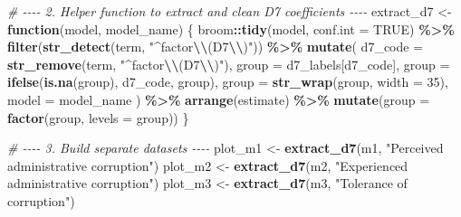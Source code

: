 \documentclass[
]{article}
\newenvironment{Shaded}{\begin{snugshade}}{\end{snugshade}}
\newcommand{\AttributeTok}[1]{\textcolor[rgb]{0.13,0.29,0.53}{#1}}
\newcommand{\CommentTok}[1]{\textcolor[rgb]{0.56,0.35,0.01}{\textit{#1}}}
\newcommand{\ConstantTok}[1]{\textcolor[rgb]{0.56,0.35,0.01}{#1}}
\newcommand{\ControlFlowTok}[1]{\textcolor[rgb]{0.13,0.29,0.53}{\textbf{#1}}}
\newcommand{\DecValTok}[1]{\textcolor[rgb]{0.00,0.00,0.81}{#1}}
\newcommand{\FunctionTok}[1]{\textcolor[rgb]{0.13,0.29,0.53}{\textbf{#1}}}
\newcommand{\NormalTok}[1]{#1}
\newcommand{\OtherTok}[1]{\textcolor[rgb]{0.56,0.35,0.01}{#1}}
\newcommand{\SpecialCharTok}[1]{\textcolor[rgb]{0.81,0.36,0.00}{\textbf{#1}}}
\newcommand{\StringTok}[1]{\textcolor[rgb]{0.31,0.60,0.02}{#1}}
\begin{document}
\begin{Shaded}
\begin{Highlighting}[]
\CommentTok{\# {-}{-}{-}{-} 2. Helper function to extract and clean D7 coefficients {-}{-}{-}{-}}
\NormalTok{extract\_d7 }\OtherTok{\textless{}{-}} \ControlFlowTok{function}\NormalTok{(model, model\_name) \{}
\NormalTok{  broom}\SpecialCharTok{::}\FunctionTok{tidy}\NormalTok{(model, }\AttributeTok{conf.int =} \ConstantTok{TRUE}\NormalTok{) }\SpecialCharTok{\%\textgreater{}\%}
    \FunctionTok{filter}\NormalTok{(}\FunctionTok{str\_detect}\NormalTok{(term, }\StringTok{"\^{}factor}\SpecialCharTok{\textbackslash{}\textbackslash{}}\StringTok{(D7}\SpecialCharTok{\textbackslash{}\textbackslash{}}\StringTok{)"}\NormalTok{)) }\SpecialCharTok{\%\textgreater{}\%}
    \FunctionTok{mutate}\NormalTok{(}
      \AttributeTok{d7\_code =} \FunctionTok{str\_remove}\NormalTok{(term, }\StringTok{"\^{}factor}\SpecialCharTok{\textbackslash{}\textbackslash{}}\StringTok{(D7}\SpecialCharTok{\textbackslash{}\textbackslash{}}\StringTok{)"}\NormalTok{),}
      \AttributeTok{group =}\NormalTok{ d7\_labels[d7\_code],}
      \AttributeTok{group =} \FunctionTok{ifelse}\NormalTok{(}\FunctionTok{is.na}\NormalTok{(group), d7\_code, group),}
      \AttributeTok{group =} \FunctionTok{str\_wrap}\NormalTok{(group, }\AttributeTok{width =} \DecValTok{35}\NormalTok{),}
      \AttributeTok{model =}\NormalTok{ model\_name}
\NormalTok{    ) }\SpecialCharTok{\%\textgreater{}\%}
    \FunctionTok{arrange}\NormalTok{(estimate) }\SpecialCharTok{\%\textgreater{}\%}
    \FunctionTok{mutate}\NormalTok{(}\AttributeTok{group =} \FunctionTok{factor}\NormalTok{(group, }\AttributeTok{levels =}\NormalTok{ group))}
\NormalTok{\}}

\CommentTok{\# {-}{-}{-}{-} 3. Build separate datasets {-}{-}{-}{-}}
\NormalTok{plot\_m1 }\OtherTok{\textless{}{-}} \FunctionTok{extract\_d7}\NormalTok{(m1, }\StringTok{"Perceived administrative corruption"}\NormalTok{)}
\NormalTok{plot\_m2 }\OtherTok{\textless{}{-}} \FunctionTok{extract\_d7}\NormalTok{(m2, }\StringTok{"Experienced administrative corruption"}\NormalTok{)}
\NormalTok{plot\_m3 }\OtherTok{\textless{}{-}} \FunctionTok{extract\_d7}\NormalTok{(m3, }\StringTok{"Tolerance of corruption"}\NormalTok{)}


\end{Highlighting}
\end{Shaded}
\end{document}
